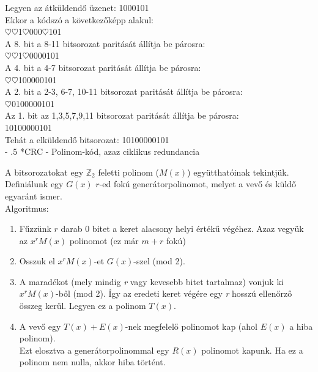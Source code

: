 \documentclass[12pt]{article}
\makeatletter
\renewcommand\paragraph{%
	\@startsection{paragraph}{4}{0mm}%
	{-\baselineskip}%
	{.5\baselineskip}%
	{\normalfont\normalsize\bfseries}}
\makeatother
\begin{document}
    \noindent Legyen az átküldendő üzenet: 1000101 \\

    \noindent Ekkor a kódszó a következőképp alakul: \\
    	{\color[rgb]{1,0,0}$\heartsuit\heartsuit$}1{\color[rgb]{1,0,0}$\heartsuit$}000{\color[rgb]{1,0,0}$\heartsuit$}101\\
    	A 8. bit a 8-11  bitsorozat paritását állítja be párosra:\\
    	{\color[rgb]{1,0,0}$\heartsuit\heartsuit$}1{\color[rgb]{1,0,0}$\heartsuit$}000{\color[rgb]{0,0,1}0101}\\
    	A 4. bit a 4-7  bitsorozat paritását állítja be párosra:\\
    	{\color[rgb]{1,0,0}$\heartsuit\heartsuit$}1{\color[rgb]{0,0,1}0000}0101\\
    	A 2. bit a 2-3, 6-7, 10-11 bitsorozat paritását állítja be párosra:\\
    	{\color[rgb]{1,0,0}$\heartsuit$}{\color[rgb]{0,0,1}01}00{\color[rgb]{0,0,1}00}01{\color[rgb]{0,0,1}01}\\
    	Az 1. bit az 1,3,5,7,9,11 bitsorozat paritását állítja be párosra: \\
    	{\color[rgb]{0,0,1}1}0{\color[rgb]{0,0,1}1}0{\color[rgb]{0,0,1}0}0{\color[rgb]{0,0,1}0}0{\color[rgb]{0,0,1}1}0{\color[rgb]{0,0,1}1}\\
    	
    \noindent Tehát a elküldendő bitsorozat:
    	{\color[rgb]{1,0,0}10}1{\color[rgb]{1,0,0}0}000{\color[rgb]{1,0,0}0}101\\

    \paragraph*{CRC - Polinom-kód, azaz ciklikus redundancia\\}

    A bitsorozatokat egy $\mathbb{Z}_2$ feletti polinom ($M(x)$) együtthatóinak tekintjük. \\
    Definiálunk egy $G(x)$ $r$-ed fokú generátorpolinomot, melyet a vevő és küldő egyaránt ismer.\\

    \noindent Algoritmus:
    \begin{enumerate}
    	\item Fűzzünk $r$ darab 0 bitet a keret alacsony helyi értékű végéhez. Azaz vegyük az $x^rM(x)$ polinomot (ez már $m+r$ fokú)
    	\item Osszuk el $x^rM(x)$-et $G(x)$-szel (mod 2).
    	\item A maradékot (mely mindig \emph{r} vagy kevesebb bitet tartalmaz) vonjuk ki \\
        $x^rM(x)$-ből (mod 2). Így az eredeti keret végére egy \emph{r} hosszú ellenőrző összeg kerül. Legyen ez a polinom $T(x)$.
    	\item A vevő egy $T(x)+E(x)$-nek megfelelő polinomot kap (ahol $E(x)$ a hiba polinom).\\
        Ezt elosztva a generátorpolinommal egy $R(x)$ polinomot kapunk. Ha ez a polinom nem nulla, akkor hiba történt.
    \end{enumerate}
\end{document}
